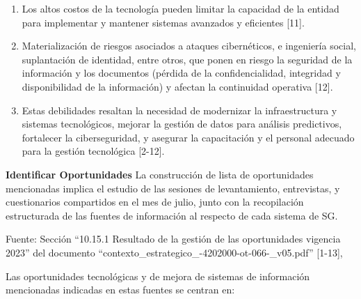 \documentclass[
	a4paper, %
	12pt, %
]{include/CSSullivanBusinessReport}
\begin{document}
\begin{enumerate}
  Obsolescencia tecnológica que implica la necesidad de renovación de
  los equipos y dificulta la prestación de los servicios de la entidad
  {[}11{]}.
\item
  Los altos costos de la tecnología pueden limitar la capacidad de la
  entidad para implementar y mantener sistemas avanzados y eficientes
  {[}11{]}.
\item
  Materialización de riesgos asociados a ataques cibernéticos, e
  ingeniería social, suplantación de identidad, entre otros, que ponen
  en riesgo la seguridad de la información y los documentos (pérdida de
  la confidencialidad, integridad y disponibilidad de la información) y
  afectan la continuidad operativa {[}12{]}.
\item
  Estas debilidades resaltan la necesidad de modernizar la
  infraestructura y sistemas tecnológicos, mejorar la gestión de datos
  para análisis predictivos, fortalecer la ciberseguridad, y asegurar la
  capacitación y el personal adecuado para la gestión tecnológica
  {[}2-12{]}.
\end{enumerate}

\textbf{Identificar Oportunidades} La construcción de lista de
oportunidades mencionadas implica el estudio de las sesiones de
levantamiento, entrevistas, y cuestionarios compartidos en el mes de
julio, junto con la recopilación estructurada de las fuentes de
información al respecto de cada sistema de SG.

Fuente: Sección ``10.15.1 Resultado de la gestión de las oportunidades
vigencia 2023'' del documento
``contexto\_estrategico\_-4202000-ot-066-\_v05.pdf'' {[}1-13{]},

Las oportunidades tecnológicas y de mejora de sistemas de información
mencionadas indicadas en estas fuentes se centran en:
\end{document}
